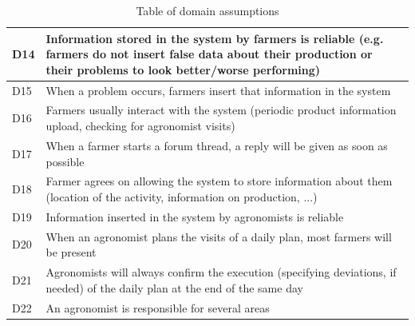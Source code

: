 \begin{table}[H]
\begin{tabular}{|l|m{}|}
        \hline
        \hline
        \hline
        
        \textsc{D14}  &    Information stored in the system by farmers is reliable (e.g. farmers do not insert false data about their production or their problems to look better/worse performing)\\
        \hline
        \textsc{D15}  &    When a problem occurs, farmers insert that information in the system\\
        \hline
        \textsc{D16}  &    Farmers usually interact with the system (periodic product information upload, checking for agronomist visits) \\
        \hline
        \textsc{D17}     &   When a farmer starts a forum thread, a reply will be given as soon as possible \\
        \hline
        \textsc{D18}  &    Farmer agrees on allowing the system to store information about them (location of the activity, information on production, ...)\\
        \hline
        
        
        \hline
        \hline
        \hline
    
        \textsc{D19}  &    Information inserted in the system by agronomists is reliable\\
        \hline
        \textsc{D20}  &    When an agronomist plans the visits of a daily plan, most farmers will be present\\
        \hline
        \textsc{D21}  &    Agronomists will always confirm the execution (specifying deviations, if needed) of the daily plan at the end of the same day\\
        \hline
        \textsc{D22}  &    An agronomist is responsible for several areas\\
        \hline
        
        
        
       
        
        
    \end{tabular}
    
    \caption{\label{tab:domainAssumptions}Table of domain assumptions}
    
\end{table}

